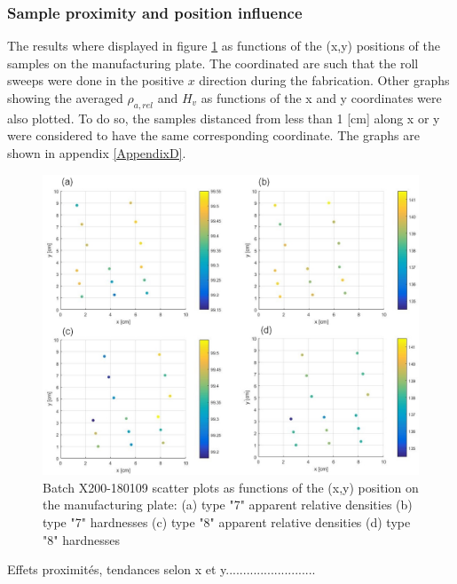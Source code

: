 \subsubsection{Sample proximity and position influence}
The results where displayed in figure \ref{fig:180109-HD} as functions of the (x,y) positions of the samples on the manufacturing plate. The coordinated are such that the roll sweeps were done in the positive $x$ direction during the fabrication. Other graphs showing the averaged $\rho_{a,rel}$ and $H_v$ as functions of the x and y coordinates were also plotted. To do so, the samples distanced from less than 1 [cm] along x or y were considered to have the same corresponding coordinate. The graphs are shown in appendix \ref{AppendixD}.\\
\begin{figure}[ht]
\centering
\centerline{\includegraphics[scale=0.62]{Images/180109-HD}}
\decoRule
\caption[Batch X200-180109 scatter plots as functions of the (x,y) position on the manufacturing plate: (a) type "7" apparent relative densities (b) type "7" hardnesses (c) type "8" apparent relative densities (d) type "8" hardnesses]{Batch X200-180109 scatter plots as functions of the (x,y) position on the manufacturing plate: (a) type "7" apparent relative densities (b) type "7" hardnesses (c) type "8" apparent relative densities (d) type "8" hardnesses}
\label{fig:180109-HD}
\end{figure} 

Effets proximités, tendances selon x et y..........................\\
